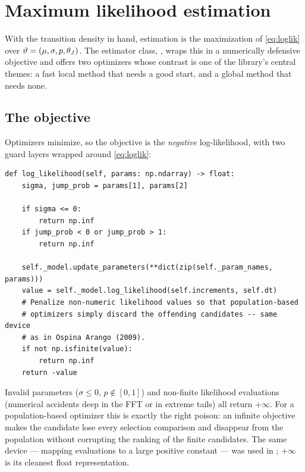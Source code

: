 \section{Maximum likelihood estimation}
\label{sec:estimation}

With the transition density in hand, estimation is the maximization of
\eqref{eq:loglik} over
$\vartheta = (\mu, \sigma, p, \theta_J)$. The estimator class,
, wraps this in a numerically defensive
objective and offers two optimizers whose contrast is one of the library's
central themes: a fast local method that needs a good start, and a global
method that needs none.

\subsection{The objective}

Optimizers minimize, so the objective is the \emph{negative}
log-likelihood, with two guard layers wrapped around \eqref{eq:loglik}:

\begin{lstlisting}[caption={The objective in \code{estimation/maximum\_likelihood.py}.}]
def log_likelihood(self, params: np.ndarray) -> float:
    sigma, jump_prob = params[1], params[2]

    if sigma <= 0:
        return np.inf
    if jump_prob < 0 or jump_prob > 1:
        return np.inf

    self._model.update_parameters(**dict(zip(self._param_names, params)))
    value = self._model.log_likelihood(self.increments, self.dt)
    # Penalize non-numeric likelihood values so that population-based
    # optimizers simply discard the offending candidates -- same device
    # as in Ospina Arango (2009).
    if not np.isfinite(value):
        return np.inf
    return -value
\end{lstlisting}

\begin{decision}
\label{dec:penalize}
Invalid parameters ($\sigma \le 0$, $p \notin [0,1]$) and non-finite
likelihood evaluations (numerical accidents deep in the FFT or in extreme
tails) all return $+\infty$. For a population-based optimizer this is
exactly the right poison: an infinite objective makes the candidate lose
every selection comparison and disappear from the population without
corrupting the ranking of the finite candidates. The same device ---
mapping  evaluations to a large positive constant --- was used
in \citet{Ospina2009}; $+\infty$ is its cleanest float representation.
\end{decision}

